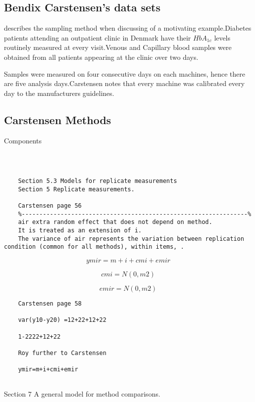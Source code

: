 \documentclass{report}
\begin{document}
	
	\subsection{Bendix Carstensen's data sets}
	\citet{bxc2008}describes the sampling method when discussing of a motivating example.Diabetes patients attending an outpatient clinic in Denmark have their $HbA_{1c}$ levels routinely measured at every visit.Venous and Capillary blood samples were obtained from all patients appearing at the clinic over two days.
	
	Samples were measured on four consecutive days on each machines, hence there are five analysis days.Carstensen notes that every machine was calibrated every day to  the manufacturers guidelines.
	
	\subsection{Carstensen Methods}
	
	Components
	
	\begin{verbatim}
	
	
	
	Section 5.3 Models for replicate measurements
	Section 5 Replicate measurements.
	
	Carstensen page 56
	%----------------------------------------------------------------%
	air extra random effect that does not depend on method.
	It is treated as an extension of i.
	The variance of air represents the variation between replication condition (common for all methods), within items, .
	\end{verbatim}
	\[ymir=m+i+cmi+emir\]
	
	\[cmi=N(0,m2)\]
	
	\[emir=N(0,m2)\]
	
	\begin{verbatim}
	Carstensen page 58
	
	var(y10-y20) =12+22+12+22
	
	1-2222+12+22
	
	Roy further to Carstensen
	
	ymir=m+i+cmi+emir
	
	\end{verbatim}
	
	
	Section 7 A general model for method comparisons.
	
\end{document}
